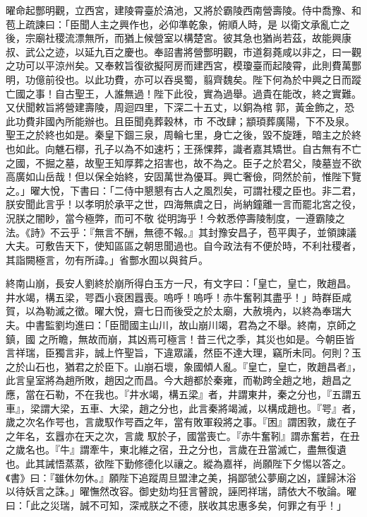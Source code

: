 \begin{pinyinscope}
 曜命起酆明觀，立西宮，建陵霄臺於滈池，又將於霸陵西南營壽陵。侍中喬豫、和苞上疏諫曰：「臣聞人主之興作也，必仰準乾象，俯順人時，是
 以衛文承亂亡之後，宗廟社稷流漂無所，而猶上候營室以構楚宮。彼其急也猶尚若茲，故能興康叔、武公之迹，以延九百之慶也。奉詔書將營酆明觀，市道芻蕘咸以非之，曰一觀之功可以平涼州矣。又奉敕旨復欲擬阿房而建西宮，模瓊臺而起陵霄，此則費萬酆明，功億前役也。以此功費，亦可以吞吳蜀，翦齊魏矣。陛下何為於中興之日而蹤亡國之事！自古聖王，人誰無過！陛下此役，實為過舉。過貴在能改，終之實難。又伏聞敕旨將營建壽陵，周迴四里，下深二十五丈，以銅為棺郭，黃金飾之，恐此功費非國內所能辦也。且臣聞堯葬穀林，市
 不改肆；顓頊葬廣陽，下不及泉。聖王之於終也如是。秦皇下錮三泉，周輪七里，身亡之後，毀不旋踵，暗主之於終也如此。向魋石槨，孔子以為不如速朽；王孫惈葬，識者嘉其矯世。自古無有不亡之國，不掘之墓，故聖王知厚葬之招害也，故不為之。臣子之於君父，陵墓豈不欲高廣如山岳哉！但以保全始終，安固萬世為優耳。興亡奢儉，冏然於前，惟陛下覽之。」曜大悅，下書曰：「二侍中懇懇有古人之風烈矣，可謂社稷之臣也。非二君，朕安聞此言乎！以孝明於承平之世，四海無虞之日，尚納鐘離一言而罷北宮之役，況朕之闇眇，當今極弊，而可不敬
 從明誨乎！今敕悉停壽陵制度，一遵霸陵之法。《詩》不云乎：『無言不酬，無德不報。』其封豫安昌子，苞平輿子，並領諫議大夫。可敷告天下，使知區區之朝思聞過也。自今政法有不便於時，不利社稷者，其詣闕極言，勿有所諱。」省酆水囿以與貧戶。



 終南山崩，長安人劉終於崩所得白玉方一尺，有文字曰：「皇亡，皇亡，敗趙昌。井水竭，構五梁，咢酉小衰困囂喪。嗚呼！嗚呼！赤牛奮靷其盡乎！」時群臣咸賀，以為勒滅之徵。曜大悅，齋七日而後受之於太廟，大赦境內，以終為奉瑞大夫。中書監劉均進曰：「臣聞國主山川，故山崩川竭，君為之不舉。終南，京師之鎮，國
 之所瞻，無故而崩，其凶焉可極言！昔三代之季，其災也如是。今朝臣皆言祥瑞，臣獨言非，誠上忤聖旨，下違眾議，然臣不達大理，竊所未同。何則？玉之於山石也，猶君之於臣下。山崩石壞，象國傾人亂。『皇亡，皇亡，敗趙昌者』，此言皇室將為趙所敗，趙因之而昌。今大趙都於秦雍，而勒跨全趙之地，趙昌之應，當在石勒，不在我也。『井水竭，構五梁』者，井謂東井，秦之分也，『五謂五車』，梁謂大梁，五車、大梁，趙之分也，此言秦將竭滅，以構成趙也。『咢』者，歲之次名作咢也，言歲馭作咢酉之年，當有敗軍殺將之事。『困』謂困敦，歲在子之年名，玄囂亦在天之次，言歲
 馭於子，國當喪亡。『赤牛奮靷』謂赤奮若，在丑之歲名也。『牛』謂牽牛，東北維之宿，丑之分也，言歲在丑當滅亡，盡無復遺也。此其誡悟蒸蒸，欲陛下勤修德化以禳之。縱為嘉祥，尚願陛下夕惕以答之。《書》曰：『雖休勿休。』願陛下追蹤周旦盟津之美，捐鄙虢公夢廟之凶，謹歸沐浴以待妖言之誅。」曜憮然改容。御史劾均狂言瞽說，誣罔祥瑞，請依大不敬論。曜曰：「此之災瑞，誠不可知，深戒朕之不德，朕收其忠惠多矣，何罪之有乎！」




\end{pinyinscope}
